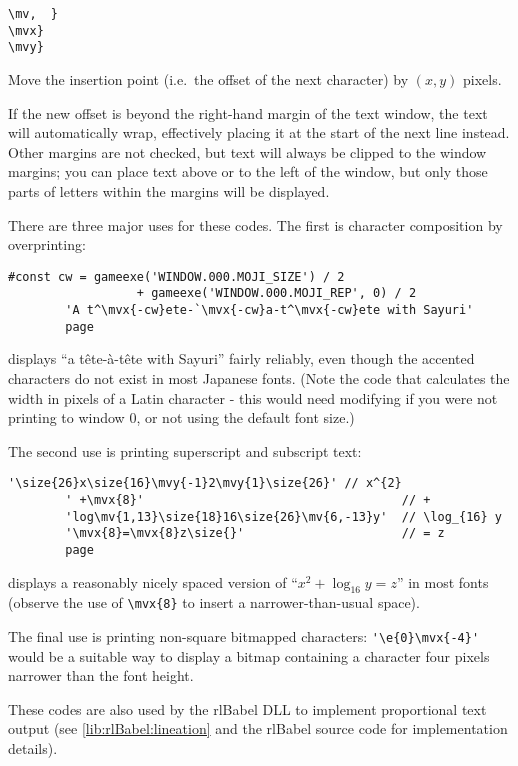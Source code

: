     \lstinline|\mv|\rawlbrace{}\lstinline|, |~\lstinline|}|\\
    \lstinline|\mvx|\rawlbrace{}\lstinline|}|\\
    \lstinline|\mvy|\rawlbrace{}\lstinline|}|
    \begin{cmdesc}
      Move the insertion point (i.e.\ the offset of the next character) by $(x, y)$
      pixels.
      
      If the new offset is beyond the right-hand margin of the text window, the text
      will automatically wrap, effectively placing it at the start of the next line
      instead.  Other margins are not checked, but text will always be clipped to the
      window margins; you can place text above or to the left of the window, but only
      those parts of letters within the margins will be displayed.
      
      There are three major uses for these codes.  The first is character composition
      by overprinting:
      \begin{lstlisting}[escapechar=@]
        #const cw = gameexe('WINDOW.000.MOJI_SIZE') / 2
                  + gameexe('WINDOW.000.MOJI_REP', 0) / 2
        'A t^\mvx{-cw}ete-`\mvx{-cw}a-t^\mvx{-cw}ete with Sayuri'
        page
      \end{lstlisting}
      \noindent displays ``a t\^ete-\`a-t\^ete with Sayuri'' fairly reliably, 
      even though the accented characters do not exist in most Japanese fonts. 
      (Note the code that calculates the width in pixels of a Latin character
      - this would need modifying if you were not printing to window 0, or not
      using the default font size.)
      
      The second use is printing superscript and subscript text:
      \begin{lstlisting}[escapechar=@]
        '\size{26}x\size{16}\mvy{-1}2\mvy{1}\size{26}' // x^{2}
        ' +\mvx{8}'                                    // +
        'log\mv{1,13}\size{18}16\size{26}\mv{6,-13}y'  // \log_{16} y
        '\mvx{8}=\mvx{8}z\size{}'                      // = z
        page
      \end{lstlisting}
      \noindent displays a reasonably nicely spaced version of ``$x^{2} + 
      \log_{16} y = z$'' in most fonts (observe the use of \lstinline|\mvx{8}| 
      to insert a narrower-than-usual space).
      
      The final use is printing non-square bitmapped characters: 
      \lstinline|'\e{0}\mvx{-4}'| would be a suitable way to display a bitmap 
      containing a character four pixels narrower than the font height.
      
      These codes are also used by the rlBabel DLL to implement proportional
      text output (see \ref{lib:rlBabel:lineation} and the rlBabel source code
      for implementation details).
    \end{cmdesc}

